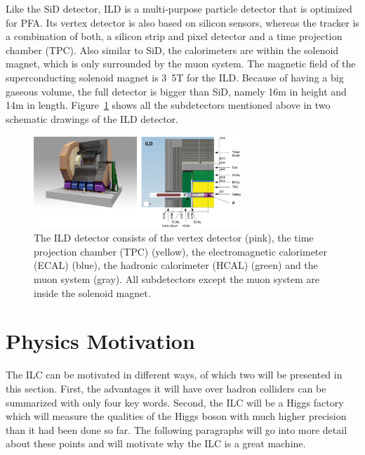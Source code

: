 Like the SiD detector, ILD is a multi-purpose particle detector that is optimized for PFA.
Its vertex detector is also based on silicon sensors, whereas the tracker is a combination of both, a silicon strip and pixel detector and a time projection chamber (TPC).
Also similar to SiD, the calorimeters are within the solenoid magnet, which is only surrounded by the muon system.
The magnetic field of the superconducting solenoid magnet is \unit{3.5}{T} for the ILD.
Because of having a big gaseous volume, the full detector is bigger than SiD, namely \unit{16}{m} in height and \unit{14}{m} in length.
Figure~\ref{fig:ILD} shows all the subdetectors mentioned above in two schematic drawings of the ILD detector.

\begin{figure}
\centering
\includegraphics[width=0.7\textwidth]{Figures/ILD.png}
\caption[Schematic drawing of the ILD detector]{The ILD detector consists of the vertex detector (pink), the time projection chamber (TPC) (yellow), the electromagnetic calorimeter (ECAL) (blue), the hadronic calorimeter (HCAL) (green) and the muon system (gray). All subdetectors except the muon system are inside the solenoid magnet.\cite[p. 34]{TDR1}}
\label{fig:ILD}
\end{figure}

\section{Physics Motivation}
\label{ILC:physicsmotivation}

The ILC can be motivated in different ways, of which two will be presented in this section.
First, the advantages it will have over hadron colliders can be summarized with only four key words.
Second, the ILC will be a Higgs factory which will measure the qualities of the Higgs boson with much higher precision than it had been done so far.
The following paragraphs will go into more detail about these points and will motivate why the ILC is a great machine.

